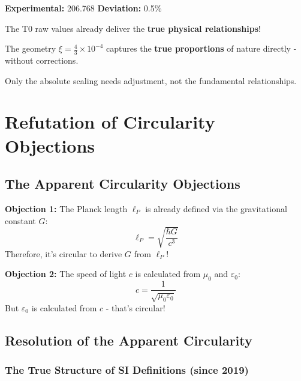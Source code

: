 \documentclass[12pt,a4paper]{article}
\theoremstyle{definition}
\begin{document}
	\textbf{Experimental:} 206.768 \quad \textbf{Deviation:} 0.5\%
	
	\begin{tcolorbox}[colback=green!5!white,colframe=green!75!black,title=Revolutionary Conclusion]
		The T0 raw values already deliver the \textbf{true physical relationships}!
		
		The geometry $\xi = \frac{4}{3} \times 10^{-4}$ captures the \textbf{true proportions} of nature directly - without corrections.
		
		Only the absolute scaling needs adjustment, not the fundamental relationships.
	\end{tcolorbox}
	
	\section{Refutation of Circularity Objections}
	
	\subsection{The Apparent Circularity Objections}
	
	\begin{tcolorbox}[colback=red!10!white,colframe=red!75!black,title=Common Criticisms]
		\textbf{Objection 1:} The Planck length $\ell_P$ is already defined via the gravitational constant $G$:
		\begin{equation}
			\ell_P = \sqrt{\frac{\hbar G}{c^3}}
		\end{equation}
		Therefore, it's circular to derive $G$ from $\ell_P$!
		
		\textbf{Objection 2:} The speed of light $c$ is calculated from $\mu_0$ and $\varepsilon_0$:
		\begin{equation}
			c = \frac{1}{\sqrt{\mu_0 \varepsilon_0}}
		\end{equation}
		But $\varepsilon_0$ is calculated from $c$ - that's circular!
	\end{tcolorbox}
	
	\subsection{Resolution of the Apparent Circularity}
	
	\subsubsection{The True Structure of SI Definitions (since 2019)}
	
\end{document}
